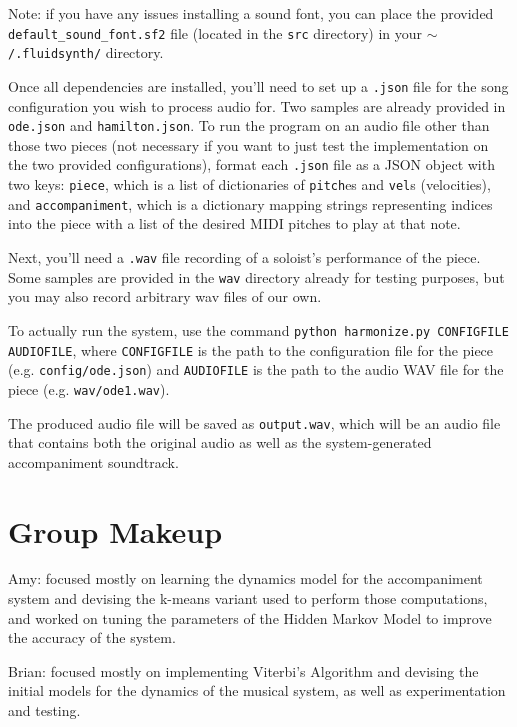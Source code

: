 \documentclass[11pt]{article}
\begin{document}
Note: if you have any issues installing a sound font, you can place the
provided \texttt{default\_sound\_font.sf2} file (located in the \texttt{src} directory)
in your \texttt{$\sim$/.fluidsynth/} directory.

Once all dependencies are installed, you'll need to set up a \texttt{.json} file
for the song configuration you wish to process audio for. Two samples are already provided in
\texttt{ode.json} and \texttt{hamilton.json}. To run the program on an audio file other
than those two pieces (not necessary if you want to just test the implementation
on the two provided configurations),
format each \texttt{.json} file as a JSON object with two keys:
\texttt{piece}, which is a list of dictionaries of \texttt{pitch}es and \texttt{vel}s
(velocities), and \texttt{accompaniment}, which is a dictionary mapping strings
representing indices into the piece with a list of the desired MIDI pitches to play
at that note.

Next, you'll need a \texttt{.wav} file recording of a soloist's performance of the piece.
Some samples are provided in the \texttt{wav} directory already for testing purposes,
but you may also record arbitrary wav files of our own.

To actually run the system, use the command
\texttt{python harmonize.py CONFIGFILE AUDIOFILE}, where
\texttt{CONFIGFILE} is the path to the configuration file for the piece
(e.g. \texttt{config/ode.json})
and \texttt{AUDIOFILE} is the path to the audio WAV file for the piece
(e.g. \texttt{wav/ode1.wav}).

The produced audio file will be saved as \texttt{output.wav}, which will
be an audio file that contains both the original audio as well as the system-generated
accompaniment soundtrack.

\section{Group Makeup}

Amy: focused mostly on learning the dynamics model for the accompaniment
system and devising the k-means variant used to perform those computations,
and worked on tuning the parameters of the Hidden Markov Model to improve
the accuracy of the system.

Brian: focused mostly on implementing Viterbi's Algorithm and devising
the initial models for the dynamics of the musical system, as well as
experimentation and testing.



\end{document}
